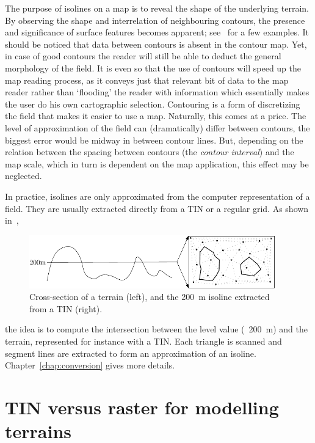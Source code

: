 The purpose of isolines on a map is to reveal the shape of the underlying terrain. 
By observing the shape and interrelation of neighbouring contours, the presence and significance of surface features becomes apparent; see~ for a few examples.
It should be noticed that data between contours is absent in the contour map. 
Yet, in case of good contours the reader will still be able to deduct the general morphology of the field. 
It is even so that the use of contours will speed up the map reading process, as it conveys just that relevant bit of data to the map reader rather than `flooding' the reader with information which essentially makes the user do his own cartographic selection. 
Contouring is a form of discretizing the field that makes it easier to use a map. 
Naturally, this comes at a price. 
The level of approximation of the field can (dramatically) differ between contours, the biggest error would be midway in between contour lines. 
But, depending on the relation between the spacing between contours (the \emph{contour interval}) and the map scale, which in turn is dependent on the map application, this effect may be neglected.


%

In practice, isolines are only approximated from the computer representation of a field.
They are usually extracted directly from a TIN or a regular grid. 
As shown in~,
\begin{figure}
  \centering
  \includegraphics[width=0.95\textwidth]{figs/isoline}
  \caption{Cross-section of a terrain (left), and the \qty{200}{\metre} isoline extracted from a TIN (right).} 
\end{figure}
the idea is to compute the intersection between the level value (\eg\ \qty{200}{m}) and the terrain, represented for instance with a TIN\@. 
Each triangle is scanned and segment lines are extracted to form an approximation of an isoline.
Chapter~\ref{chap:conversion} gives more details.

%
\section[TIN versus raster]{TIN versus raster for modelling terrains}

